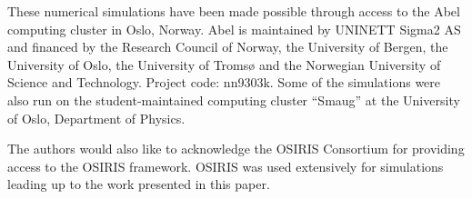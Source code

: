 \documentclass[aps,prstab,reprint,amsmath,amssymb,groupedaddress]{revtex4-1}
\begin{document}
These numerical simulations have been made possible through access to the Abel computing cluster in Oslo, Norway. Abel
is maintained by UNINETT Sigma2 AS and financed by the Research Council of Norway, the University of Bergen, the
University of Oslo, the University of Tromsø and the Norwegian University of Science and Technology. Project code:
nn9303k. Some of the simulations were also run on the student-maintained computing cluster ``Smaug'' at the University
of Oslo, Department of Physics.

The authors would also like to acknowledge the OSIRIS Consortium for providing access to the OSIRIS framework. OSIRIS
was used extensively for simulations leading up to the work presented in this paper.


\end{document}
